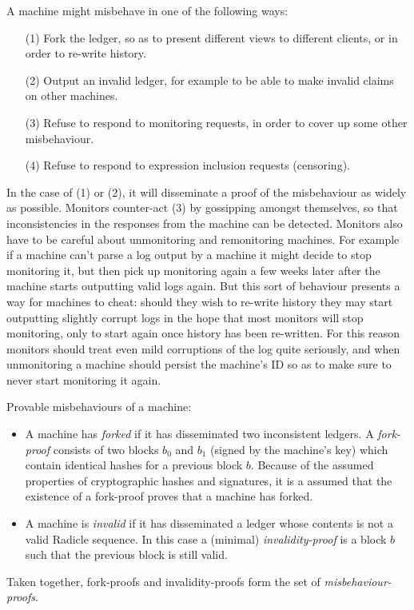 \documentclass[a4paper, oneside, 10pt]{amsart}
\begin{document}
A machine might misbehave in one of the following ways:
\begin{itemize}
\item[(1)]
  Fork the ledger, so as to present different views to different clients, or in
  order to re-write history.
\item[(2)]
  Output an invalid ledger, for example to be able to make invalid claims on
  other machines.
\item[(3)]
  Refuse to respond to monitoring requests, in order to cover up some other
  misbehaviour.
\item[(4)]
  Refuse to respond to expression inclusion requests (censoring).
\end{itemize}

In the case of (1) or (2), it will disseminate a proof of the misbehaviour as
widely as possible. Monitors counter-act (3) by gossipping amongst themselves,
so that inconsistencies in the responses from the machine can be
detected. Monitors also have to be careful about unmonitoring and remonitoring
machines. For example if a machine can't parse a log output by a machine it
might decide to stop monitoring it, but then pick up monitoring again a few
weeks later after the machine starts outputting valid logs again. But this sort
of behaviour presents a way for machines to cheat: should they wish to re-write
history they may start outputting slightly corrupt logs in the hope that most
monitors will stop monitoring, only to start again once history has been
re-written. For this reason monitors should treat even mild corruptions of the
log quite seriously, and when unmonitoring a machine should persist the
machine's ID so as to make sure to never start monitoring it again.

Provable misbehaviours of a machine:
\begin{itemize}
\item
  A machine has \emph{forked} if it has disseminated two inconsistent ledgers. A
  \emph{fork-proof} consists of two blocks $b_0$ and $b_1$ (signed by the
  machine's key) which contain identical hashes for a previous block
  $b$. Because of the assumed properties of cryptographic hashes and signatures,
  it is a assumed that the existence of a fork-proof proves that a machine has
  forked.
\item
  A machine is \emph{invalid} if it has disseminated a ledger whose contents is
  not a valid Radicle sequence. In this case a (minimal) \emph{invalidity-proof}
  is a block $b$ such that the previous block is still valid.
\end{itemize}
Taken together, fork-proofs and invalidity-proofs form the set of
\emph{misbehaviour-proofs}.
\end{document}
